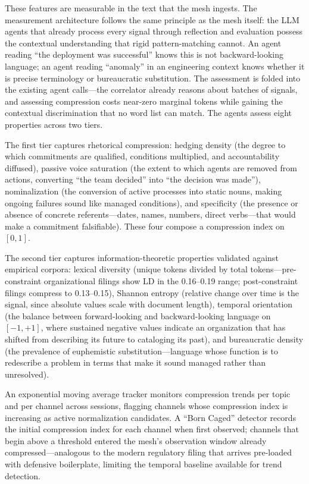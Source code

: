 \documentclass[11pt,a4paper]{article}
\begin{document}
These features are measurable in the text that the mesh ingests. The measurement architecture follows the same principle as the mesh itself: the LLM agents that already process every signal through reflection and evaluation possess the contextual understanding that rigid pattern-matching cannot. An agent reading ``the deployment was successful'' knows this is not backward-looking language; an agent reading ``anomaly'' in an engineering context knows whether it is precise terminology or bureaucratic substitution. The assessment is folded into the existing agent calls---the correlator already reasons about batches of signals, and assessing compression costs near-zero marginal tokens while gaining the contextual discrimination that no word list can match. The agents assess eight properties across two tiers.

The first tier captures rhetorical compression: hedging density (the degree to which commitments are qualified, conditions multiplied, and accountability diffused), passive voice saturation (the extent to which agents are removed from actions, converting ``the team decided'' into ``the decision was made''), nominalization (the conversion of active processes into static nouns, making ongoing failures sound like managed conditions), and specificity (the presence or absence of concrete referents---dates, names, numbers, direct verbs---that would make a commitment falsifiable). These four compose a compression index on $[0, 1]$.

The second tier captures information-theoretic properties validated against empirical corpora: lexical diversity (unique tokens divided by total tokens---pre-constraint organizational filings show LD in the 0.16--0.19 range; post-constraint filings compress to 0.13--0.15), Shannon entropy (relative change over time is the signal, since absolute values scale with document length), temporal orientation (the balance between forward-looking and backward-looking language on $[-1, +1]$, where sustained negative values indicate an organization that has shifted from describing its future to cataloging its past), and bureaucratic density (the prevalence of euphemistic substitution---language whose function is to redescribe a problem in terms that make it sound managed rather than unresolved).

An exponential moving average tracker monitors compression trends per topic and per channel across sessions, flagging channels whose compression index is increasing as active normalization candidates. A ``Born Caged'' detector records the initial compression index for each channel when first observed; channels that begin above a threshold entered the mesh's observation window already compressed---analogous to the modern regulatory filing that arrives pre-loaded with defensive boilerplate, limiting the temporal baseline available for trend detection.
\end{document}
